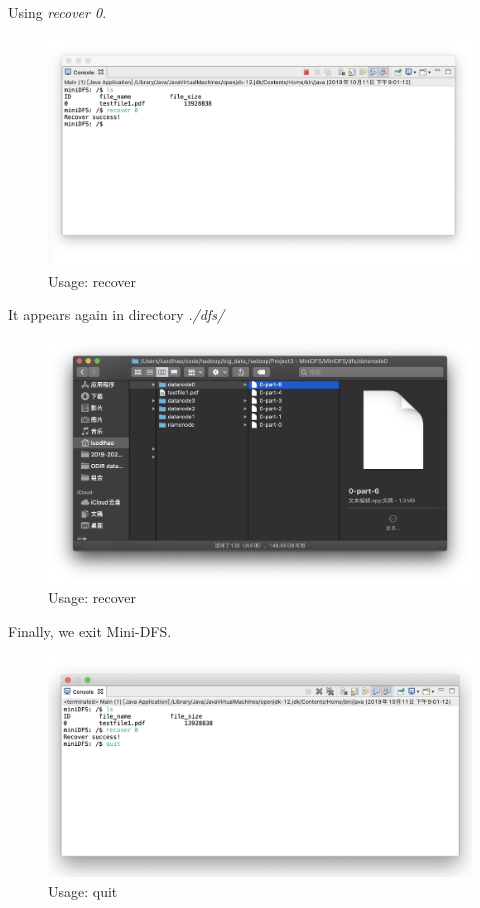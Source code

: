 \documentclass[10pt]{article}
\begin{document}
Using \textit{recover 0}.

\begin{figure}[H]
\centerline{\includegraphics[width = 1\textwidth]{screenshot//recover_02.png}}
\caption{Usage: recover}
\end{figure}

It appears again in directory \textit{./dfs/}

\begin{figure}[H]
\centerline{\includegraphics[width = 1\textwidth]{screenshot//recover_03.png}}
\caption{Usage: recover}
\end{figure}

Finally, we exit Mini-DFS.

\begin{figure}[H]
\centerline{\includegraphics[width = 1\textwidth]{screenshot//quit_01.png}}
\caption{Usage: quit}
\end{figure}
\end{document}
